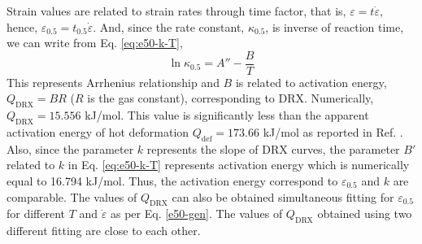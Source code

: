 \documentclass[a4paper, 11pt, dvipsnames]{article}
\begin{document}
Strain values are related to strain rates through time factor, that is, $\varepsilon = t \dot{\varepsilon}$, hence, $\varepsilon_{0.5} = t_{0.5} \dot{\varepsilon}$. And, since the rate constant, $\kappa_{0.5}$, is inverse of reaction time, we can write from Eq. \eqref{eq:e50-k-T},
\begin{equation*}
\ln \kappa_{0.5} = A'' - \frac{B}{T}
\end{equation*}
This represents Arrhenius relationship and $B$ is related to activation energy, $Q_{\text{DRX}} = BR$ ($R$ is the gas constant), corresponding to DRX. Numerically, $Q_{\text{DRX}} = 15.556$ kJ/mol. This value is significantly less than the apparent activation energy of hot deformation $Q_{\text{def}} = 173.66$ kJ/mol as reported in Ref. \cite{Z1}. Also, since the parameter $k$ represents the slope of DRX curves, the parameter $B'$ related to $k$ in Eq. \eqref{eq:e50-k-T} represents activation energy which is numerically equal to 16.794 kJ/mol. Thus, the activation energy correspond to $\varepsilon_{0.5}$ and $k$ are comparable. The values of $Q_\text{DRX}$ can also be obtained simultaneous fitting for $\varepsilon_{0.5}$ for different $T$ and $\dot{\varepsilon}$ as per Eq. \eqref{e50-gen}. The values of $Q_{\text{DRX}}$ obtained using two different fitting are close to each other. 
\end{document}
